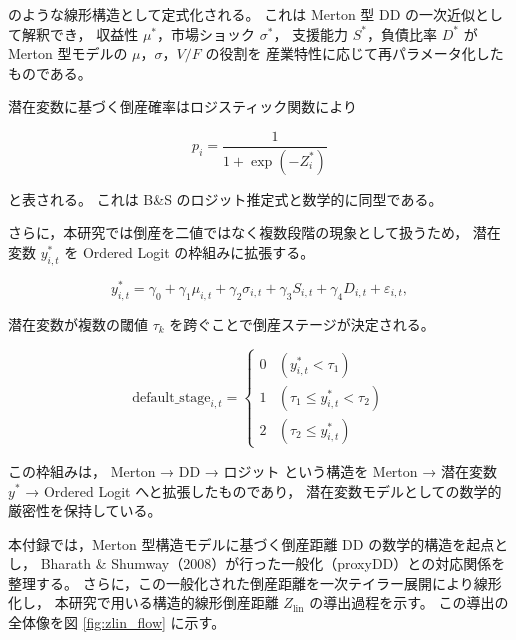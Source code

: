 のような線形構造として定式化される。
これは Merton 型 DD の一次近似として解釈でき，
収益性 $\mu^{\ast}$，市場ショック $\sigma^{\ast}$，
支援能力 $S^{\ast}$，負債比率 $D^{\ast}$ が
Merton 型モデルの $\mu$，$\sigma$，$V/F$ の役割を
産業特性に応じて再パラメータ化したものである。

潜在変数に基づく倒産確率はロジスティック関数により



\[
p_i
=
\frac{1}{1 + \exp(-Z^{\ast}_i)}
\]



と表される。
これは B\&S のロジット推定式と数学的に同型である。

さらに，本研究では倒産を二値ではなく複数段階の現象として扱うため，
潜在変数 $y^*_{i,t}$ を Ordered Logit の枠組みに拡張する。



\[
y^*_{i,t}
=
\gamma_0 + \gamma_1 \mu_{i,t} + \gamma_2 \sigma_{i,t}
+ \gamma_3 S_{i,t} + \gamma_4 D_{i,t} + \varepsilon_{i,t},
\]



潜在変数が複数の閾値 $\tau_k$ を跨ぐことで倒産ステージが決定される。



\[
\text{default\_stage}_{i,t} =
\begin{cases}
0 & (y^*_{i,t} < \tau_1) \\
1 & (\tau_1 \le y^*_{i,t} < \tau_2) \\
2 & (\tau_2 \le y^*_{i,t})
\end{cases}
\]



この枠組みは，
Merton → DD → ロジット  
という構造を  
Merton → 潜在変数 $y^*$ → Ordered Logit  
へと拡張したものであり，
潜在変数モデルとしての数学的厳密性を保持している。

本付録では，Merton 型構造モデルに基づく倒産距離 DD の数学的構造を起点とし，
Bharath \& Shumway（2008）が行った一般化（proxyDD）との対応関係を整理する。
さらに，この一般化された倒産距離を一次テイラー展開により線形化し，
本研究で用いる構造的線形倒産距離 \(Z_{\text{lin}}\) の導出過程を示す。
この導出の全体像を図 \ref{fig:zlin_flow} に示す。

